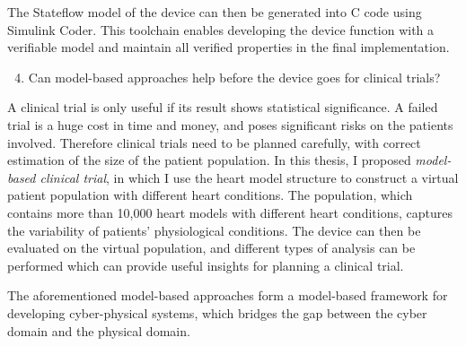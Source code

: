 \documentclass[a4paper,11pt]{article}
\begin{document}
The Stateflow model of the device can then be generated into C code using Simulink Coder.
This toolchain enables developing the device function with a verifiable model and maintain all verified properties in the final implementation.
\begin{enumerate}
\setcounter{enumi}{3}
	\item Can model-based approaches help before the device goes for clinical trials?
\end{enumerate}
A clinical trial is only useful if its result shows statistical significance.
A failed trial is a huge cost in time and money, and poses significant risks on the patients involved.
Therefore clinical trials need to be planned carefully, with correct estimation of the size of the patient population.
In this thesis, I proposed  \emph{model-based clinical trial}, in which I use the heart model structure to construct a virtual patient population with different heart conditions.
The population, which contains more than 10,000 heart models with different heart conditions, captures the variability of patients' physiological conditions.
The device can then be evaluated on the virtual population, and different types of analysis can be performed which can provide useful insights for planning a clinical trial.

The aforementioned model-based approaches form a model-based framework for developing cyber-physical systems, which bridges the gap between the cyber domain and the physical domain.
\end{document}

